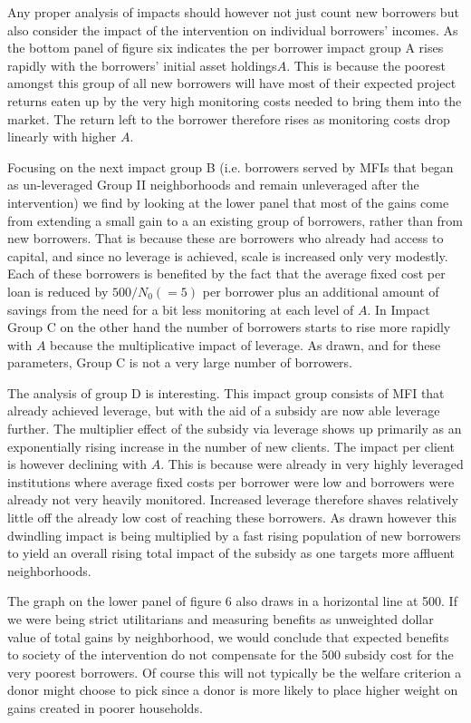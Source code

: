 \documentclass{article} %
\begin{document}
Any proper analysis of impacts should however not just count new borrowers but also consider the impact of the intervention on individual borrowers' incomes.  As the bottom panel of figure six indicates the per borrower impact group A rises rapidly with the borrowers' initial asset holdings$A$. This is because the poorest amongst this group of all new borrowers will have most of their expected project returns eaten up by the very high monitoring costs needed to bring them into the market.  The return left to the borrower therefore rises as monitoring costs drop linearly with higher $A$. 

Focusing on the next impact group B (i.e. borrowers served by MFIs that began as un-leveraged Group II neighborhoods and remain unleveraged after the intervention) we find by looking at the lower panel that most of the gains come from extending a small gain to a an existing group of borrowers, rather than from new borrowers.  That is because these are borrowers who already had access to capital, and since no leverage is achieved, scale is increased only very modestly. Each of these borrowers is benefited by the fact that the average fixed cost per loan is reduced by $500/N_{0} (=5)$ per borrower plus an additional amount of savings from the need for a bit less monitoring at each level of $A$.   In Impact Group C on the other hand the number of borrowers starts to rise more rapidly with $A$ because the multiplicative impact of leverage.  As drawn, and for these parameters, Group C is not a very large number of borrowers. 

The analysis of group D is interesting.  This impact group consists of MFI that already achieved leverage, but with the aid of a subsidy are now able leverage further.  The multiplier effect of the subsidy via leverage shows up primarily as an exponentially rising increase in the number of new clients.  The impact per client is however declining with $A.$ This is because were already in very highly leveraged institutions where average fixed costs per borrower were low and borrowers were already not very heavily monitored.  Increased leverage therefore shaves relatively little off the already low cost of reaching these borrowers.  As drawn however this dwindling impact is being multiplied by a fast rising population of new borrowers to yield an overall rising total impact of the subsidy as one targets more affluent neighborhoods. 

The graph on the lower panel of figure 6 also draws in a horizontal line at 500.  If we were being strict utilitarians and measuring benefits as unweighted dollar value of total gains by neighborhood, we would conclude that expected benefits to society of the intervention do not compensate for the 500 subsidy cost for the very poorest borrowers.  Of course this will not typically be the welfare criterion a donor might choose to pick since a donor is more likely to place higher weight on gains created in poorer households. 
\end{document}
